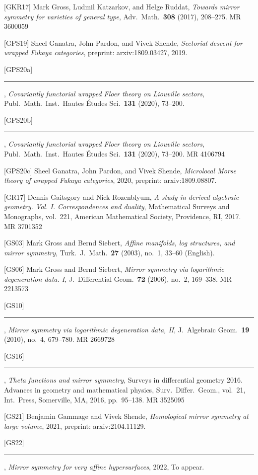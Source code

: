 [GKR17] Mark Gross, Ludmil Katzarkov, and Helge Ruddat, \emph{Towards mirror symmetry
for varieties of general type}, Adv.\ Math.\ \textbf{308} (2017), 208--275. MR 3600059

[GPS19] Sheel Ganatra, John Pardon, and Vivek Shende, \emph{Sectorial descent for
wrapped Fukaya categories}, preprint: arxiv:1809.03427, 2019.

[GPS20a] \rule[0.4ex]{2.6em}{0.4pt} , \emph{Covariantly functorial wrapped Floer theory
on Liouville sectors}, Publ.\ Math.\ Inst.\ Hautes \'Etudes Sci.\ \textbf{131} (2020),
73--200.

[GPS20b] \rule[0.4ex]{2.6em}{0.4pt} , \emph{Covariantly functorial wrapped Floer theory
on Liouville sectors}, Publ.\ Math.\ Inst.\ Hautes \'Etudes Sci.\ \textbf{131} (2020),
73--200. MR 4106794

[GPS20c] Sheel Ganatra, John Pardon, and Vivek Shende, \emph{Microlocal Morse theory of
wrapped Fukaya categories}, 2020, preprint: arxiv:1809.08807.

[GR17] Dennis Gaitsgory and Nick Rozenblyum, \emph{A study in derived algebraic
geometry. Vol. I. Correspondences and duality}, Mathematical Surveys and Monographs,
vol.~221, American Mathematical Society, Providence, RI, 2017. MR 3701352

[GS03] Mark Gross and Bernd Siebert, \emph{Affine manifolds, log structures, and mirror
symmetry}, Turk.\ J.\ Math.\ \textbf{27} (2003), no.~1, 33--60 (English).

[GS06] Mark Gross and Bernd Siebert, \emph{Mirror symmetry via logarithmic degeneration
data. I}, J.\ Differential Geom.\ \textbf{72} (2006), no.~2, 169--338. MR 2213573


[GS10] \rule[0.4ex]{2.6em}{0.4pt} , \emph{Mirror symmetry via logarithmic degeneration
data, II}, J.\ Algebraic Geom.\ \textbf{19} (2010), no.~4, 679--780. MR 2669728

[GS16] \rule[0.4ex]{2.6em}{0.4pt} , \emph{Theta functions and mirror symmetry}, Surveys
in differential geometry 2016. Advances in geometry and mathematical physics, Surv.\
Differ.\ Geom., vol.~21, Int.\ Press, Somerville, MA, 2016, pp.~95--138. MR 3525095

[GS21] Benjamin Gammage and Vivek Shende, \emph{Homological mirror symmetry at large
volume}, 2021, preprint: arxiv:2104.11129.

[GS22] \rule[0.4ex]{2.6em}{0.4pt} , \emph{Mirror symmetry for very affine hypersurfaces},
2022, To appear.

